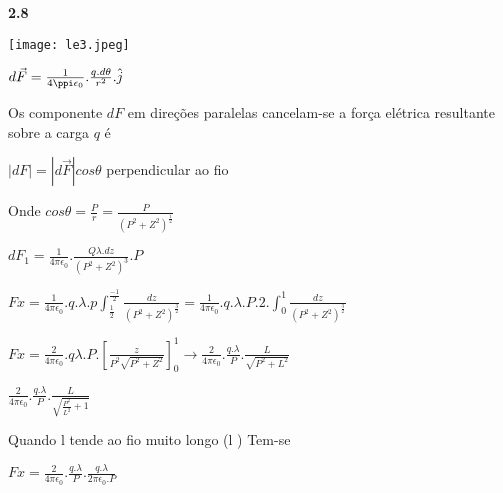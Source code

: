 \documentclass{article}
\begin{document}
\textbf{2.8}\newline

\texttt{[image: le3.jpeg]}\newline

$d \vec F = \frac{1}{4\ppi\epsilon_0}.\frac{q.d\theta}{r^2}. \hat{j}$\newline

Os componente $dF$ em direções paralelas cancelam-se a força elétrica resultante sobre a carga $q$ é \newline

$|dF| = |d \vec F| cos\theta$ perpendicular  ao fio\newline

Onde $cos\theta = \frac{P}{r} = \frac{P}{(P^2 + Z^2)^{\frac{1}{2}}}$\newline

$dF_1 = \frac{1}{4\pi\epsilon_0} .\frac{Q\lambda.dz}{(P^2 + Z^2)^3} . P$\newline

$Fx = \frac{1}{4\pi\epsilon_0}.q.\lambda.p \int_\frac{1}{2}^\frac{-1}{2} \frac{dz}{(P^2 +Z^2)^\frac{3}{2}} = \frac{1}{4\pi\epsilon_0}.q.\lambda.P.2. \int_0^1\frac{dz}{(P^2+Z^2)^\frac{3}{2}}$\newline

$Fx = \frac{2}{4\pi\epsilon_0}.q\lambda.P.[\frac{z}{P^2\sqrt{P^2+Z^2}}]_0^1\rightarrow\frac{2}{4\pi\epsilon_0}.\frac{q.\lambda}{P}.\frac{L}{\sqrt{P^2+L^2}}$\newline

$\frac{2}{4\pi\epsilon_0}.\frac{q.\lambda}{P}.\frac{L}{\sqrt{\frac{P^2}{L^2}+1}}$\newline

Quando l tende ao fio muito longo (l \rightarrow \infty)\newline
Tem-se\newline

$Fx = \frac{2}{4\pi\epsilon_0}.\frac{q.\lambda}{P}.\frac{q.\lambda}{2\pi\epsilon_0 .P}$\newline
\end{document}
